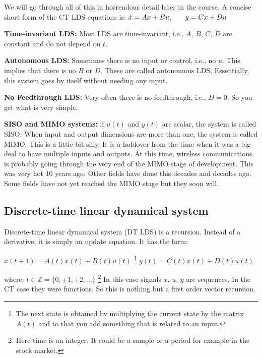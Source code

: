 \documentclass{../tufte-handout}
\begin{document}
We will go through all of this in horrendous detail later in the course. A concise short form of the CT LDS equations is: \newline
\vspace{0.15in}
$\dot x = Ax + Bu, \hspace{0.25in} y = Cx + Du$
\vspace{0.15in}

\textbf{Time-invariant LDS:} Most LDS are time-invariant, i.e., $A$, $B$, $C$, $D$ are constant and do not depend on $t$.

 \textbf{Autonomous LDS:}  Sometimes there is no input or control, i.e., no $u$. This implies that there is no $B$ or $D$. These are called autonomous LDS. Essentially, this system goes by itself without needing any input. 
 
 \textbf{No Feedthrough LDS:} Very often there is no feedthrough, i.e., $D=0$. So you get what is very simple. 
 
 \textbf{SISO and MIMO systems:} if $u(t)$ and $y(t)$ are scalar, the system is called SISO. When input and output dimensions are more than one, the system is called MIMO. This is a little bit silly. It is a holdover from the time when it was a big deal to have multiple inputs and outputs. At this time, wireless communications is probably going through the very end of the MIMO stage of development. This was very hot 10 years ago. Other fields have done this decades and decades ago. Some fields have not yet reached the MIMO stage but they soon will. 


\subsection{Discrete-time linear dynamical system}



Discrete-time linear dynamical system (DT LDS) is a recursion. Instead of a derivative, it is simply an update equation. It has the form: 

\vspace{0.15in}
$x(t+1) = A(t)x(t) + B(t)u(t)$ \footnote{The next state is obtained by multiplying the current state by the matrix $A(t)$ and to that you add something that is related to an input.} \newline
$y(t) = C(t)x(t) + D(t)u(t)$
\vspace{0.15in}

where: \newline
$t \in \mathbb{Z} = \{0, \pm 1, \pm 2, ...\}$ \footnote{Here time is an integer. It could be a sample or a period for example in the stock market.}\newline
In this case signals $x$, $u$, $y$ are sequences. In the CT case they were functions. So this is nothing but a first order vector recursion. 
\end{document}

